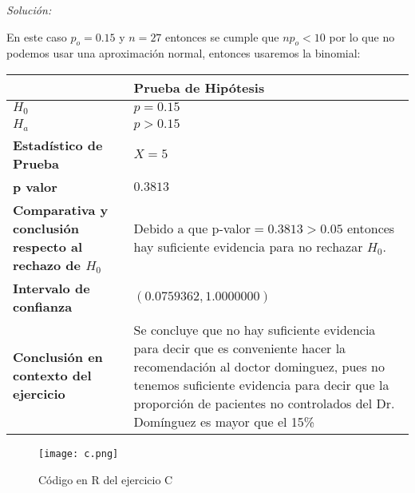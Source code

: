 \documentclass[12pt]{article}
\newenvironment{sol}
    {\emph{Solución:}
    }
    {
    }
\begin{document}
\begin{sol}
En este caso $p_o=0.15$ y $n=27$ entonces se cumple que $np_o<10$ por lo que no podemos usar una aproximación normal, entonces usaremos la binomial:
\begin{table}[h!]
\centering
\begin{tabular}{|>{\raggedright\arraybackslash}m{6cm}|>{\raggedright\arraybackslash}m{6cm}|}
\hline
 & \textbf{Prueba de Hipótesis} \\ \hline
$H_0$ & $p=0.15$ \\ \hline
$H_a$ & $p>0.15$ \\ \hline
\textbf{Estadístico de Prueba} & \vspace{0.5cm}$X=5$\vspace{0.5cm} \\ \hline
\textbf{p valor} & $0.3813$ \\ \hline
\textbf{Comparativa y conclusión respecto al rechazo de $H_0$} & Debido a que p-valor$=0.3813>0.05$ entonces hay suficiente evidencia para no rechazar $H_0$. \\ \hline
\textbf{Intervalo de confianza} & $(0.0759362,1.0000000)$ \\ \hline
\textbf{Conclusión en contexto del ejercicio} & Se concluye que no hay suficiente evidencia para decir que es conveniente hacer la recomendación al doctor dominguez, pues no tenemos suficiente evidencia para decir que la proporción de pacientes no controlados del Dr. Domínguez es mayor que el 15\% \\ \hline
\end{tabular}
\label{tab:hipotesis}
\end{table}

\begin{figure}[h]  %
    \centering      %
    \texttt{[image: c.png]} 
    \caption{Código en R del ejercicio C}
\end{figure}
\end{sol}
\pagebreak

\end{document}
